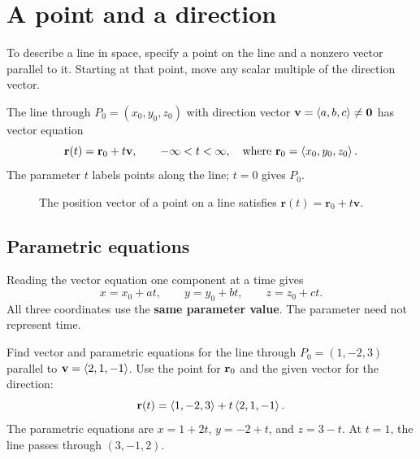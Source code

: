 \documentclass[11pt]{article}
\begin{document}

\section{A point and a direction}
To describe a line in space, specify a point on the line and a nonzero
vector parallel to it. Starting at that point, move any scalar multiple of
the direction vector.

\begin{definition}
The line through $P_0=(x_0,y_0,z_0)$ with direction vector
$\mathbf{v}=\left\langle a,b,c\right\rangle\ne\mathbf{0}$ has vector equation
\[
 \mathbf{r}(t)=\mathbf{r}_0+t\mathbf{v},\qquad -\infty<t<\infty,
 \quad\text{where }\mathbf{r}_0=\left\langle x_0,y_0,z_0\right\rangle.
\]
The parameter $t$ labels points along the line; $t=0$ gives $P_0$.
\end{definition}

\begin{figure}[H]
    \centering
    \caption{The position vector of a point on a line
    satisfies $\mathbf r(t)=\mathbf r_0+t\mathbf v$.}
    \label{fig:vector-line}
\end{figure}

\subsection{Parametric equations}
Reading the vector equation one component at a time gives
\[
 x=x_0+at,\qquad y=y_0+bt,\qquad z=z_0+ct.
\]
All three coordinates use the \textbf{same parameter value}. The parameter
need not represent time.

\begin{example}{Find vector and parametric equations for the line through
$P_0=(1,-2,3)$ parallel to $\mathbf{v}=\left\langle 2,1,-1\right\rangle$.}
Use the point for $\mathbf{r}_0$ and the given vector for the direction:
\[
 \mathbf{r}(t)=\left\langle 1,-2,3\right\rangle+t\left\langle 2,1,-1\right\rangle.
\]
The parametric equations are $x=1+2t$, $y=-2+t$, and $z=3-t$.
At $t=1$, the line passes through $(3,-1,2)$.
\end{example}
\end{document}
